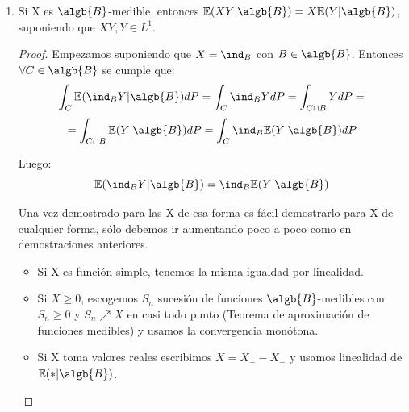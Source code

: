 \documentclass{apuntes}
\begin{document}
\begin{enumerate}
\begin{proof}
Para el siguiente paso lo único que hacemos es aplicar la definición de esperanza condicionada (el punto 2: $\forall B \in \algb{B}$, $\int_{B}\mathbb{E}(X|\algb{B})dP=\int_{B}XdP$):

\[
\lim_{n \rightarrow \infty}\int_B Y_ndP \leq \lim_{n \rightarrow \infty}\int_{\Omega} Y_ndP =
\]

Y otra vez usamos el TCD:
\[
= \int_B \lim_{n \rightarrow \infty} Y_ndP = 0
\]

Ya que $0 \leq X_n \nearrow X$ y por tanto $Y_n = X-X_n \searrow 0 $. Y con esto lo hemos demostrado en casi todo punto.

Ahora vamos a ver que se cumple en $L^1$, es decir que:
\[
\lim_{n \rightarrow \infty} \mathbb{E}(X_n|\algb{B}) - \mathbb{E}(X|\algb{B}) = \lim_{n \rightarrow \infty} \mathbb{E}(X-X_n|\algb{B}) = 0 \text{ en } L^1
\]

Por tanto:
\[
 \lim_{n \rightarrow \infty} \norm{\mathbb{E}(X-X_n|\algb{B})}_1 = \lim_{n \rightarrow \infty} \norm{\mathbb{E}(X|\algb{B}) - \mathbb{E}(X_n|\algb{B})}_1 =
\]
 
\[
= \lim_{n \rightarrow \infty} \mathbb{E}\abs{\mathbb{E}(Y_n|\algb{B})} = \lim_{n \rightarrow \infty} \mathbb{E}(Y_n) \text{ y por el TCD = }  \mathbb{E}(\lim_{n \rightarrow \infty}Y_n)=0
\]
\end{proof}
\item Si X es $\algb{B}$-medible, entonces $\mathbb{E}(XY|\algb{B}) = X\mathbb{E}(Y|\algb{B})$, suponiendo que $XY,Y \in L^1$.
\begin{proof}
Empezamos suponiendo que $X=\ind_B$ con $B \in \algb{B}$. Entonces $\forall C \in \algb{B}$ se cumple que:
\[
\int_C \mathbb{E}(\ind_BY|\algb{B})dP = \int_C \ind_BYdP=\int_{C\cap B} YdP =
\]
\[
 =\int_{C\cap B} \mathbb{E}(Y|\algb{B})dP = \int_C \ind_B\mathbb{E}(Y|\algb{B})dP 
\]

Luego:
\[
\mathbb{E}(\ind_BY|\algb{B}) = \ind_B\mathbb{E}(Y|\algb{B})
\]

Una vez demostrado para las X de esa forma es fácil demostrarlo para X de cualquier forma, sólo debemos ir aumentando poco a poco como en demostraciones anteriores.
\begin{itemize}
\item Si X es función simple, tenemos la misma igualdad por linealidad.
\item Si $X \geq 0$, escogemos $S_n$ sucesión de funciones $\algb{B}$-medibles con $S_n\geq 0$ y $S_n \nearrow X$ en casi todo punto (Teorema de aproximación de funciones medibles) y usamos la convergencia monótona.
\item Si X toma valores reales escribimos $X=X_+ - X_-$ y usamos linealidad de $\mathbb{E}(*|\algb{B})$.


\end{itemize}
\end{proof}
\end{enumerate}
\end{document}
